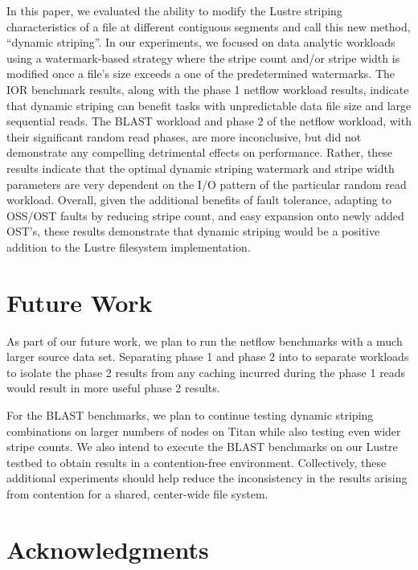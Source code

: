 \documentclass[conference,compsoc]{IEEEtran}
\begin{document}
In this paper, we evaluated the ability to modify the Lustre striping characteristics of a file at different contiguous segments and call this new method, ``dynamic striping''. In our experiments, we focused on data analytic workloads using a watermark-based strategy where the stripe count and/or stripe width is modified once a file's size exceeds a one of the predetermined watermarks. The IOR benchmark results, along with the phase 1 netflow workload results, indicate that dynamic striping can benefit tasks with unpredictable data file size and large sequential reads. The BLAST workload and phase 2 of the netflow workload, with their significant random read phases, are more inconclusive, but did not demonstrate any compelling detrimental effects on performance. Rather, these results indicate that the optimal dynamic striping watermark and stripe width parameters are very dependent on the I/O pattern of the particular random read workload.  Overall, given the additional benefits of fault tolerance, adapting to OSS/OST faults by reducing stripe count, and easy expansion onto newly added OST's, these results demonstrate that dynamic striping would be a positive addition to the Lustre filesystem implementation.

\section{Future Work}

As part of our future work, we plan to run the netflow benchmarks with a much larger source data set. Separating phase 1 and phase 2 into to separate workloads to isolate the phase 2 results from any caching incurred during the phase 1 reads would result in more useful phase 2 results.

For the BLAST benchmarks, we plan to continue testing dynamic striping combinations on larger numbers of nodes on Titan while also testing even wider stripe counts. We also intend to execute the BLAST benchmarks on our Lustre testbed to obtain results in a contention-free environment. Collectively, these additional experiments should help reduce the inconsistency in the results arising from contention for a shared, center-wide file system.






\ifCLASSOPTIONcompsoc
\section*{Acknowledgments}
\else
\end{document}
